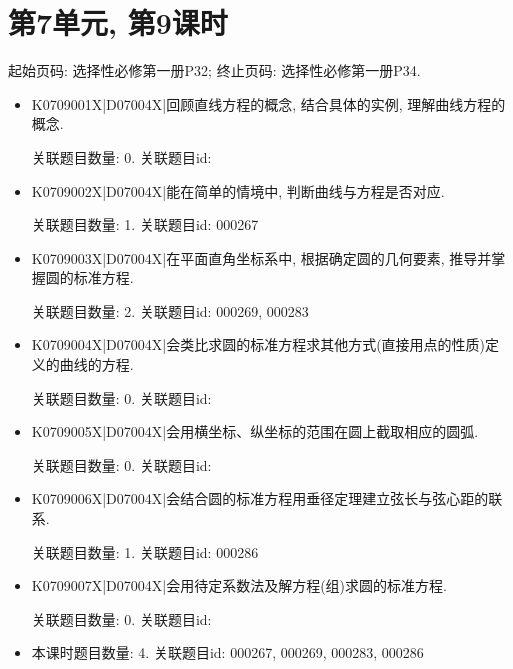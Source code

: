 \section*{第7单元, 第9课时}
起始页码: 选择性必修第一册P32; 终止页码: 选择性必修第一册P34.
\begin{itemize}
\item K0709001X|D07004X|回顾直线方程的概念, 结合具体的实例, 理解曲线方程的概念.

关联题目数量: 0. 关联题目id: 

\item K0709002X|D07004X|能在简单的情境中, 判断曲线与方程是否对应.

关联题目数量: 1. 关联题目id: 000267

\item K0709003X|D07004X|在平面直角坐标系中, 根据确定圆的几何要素, 推导并掌握圆的标准方程.

关联题目数量: 2. 关联题目id: 000269, 000283

\item K0709004X|D07004X|会类比求圆的标准方程求其他方式(直接用点的性质)定义的曲线的方程.

关联题目数量: 0. 关联题目id: 

\item K0709005X|D07004X|会用横坐标、纵坐标的范围在圆上截取相应的圆弧.

关联题目数量: 0. 关联题目id: 

\item K0709006X|D07004X|会结合圆的标准方程用垂径定理建立弦长与弦心距的联系.

关联题目数量: 1. 关联题目id: 000286

\item K0709007X|D07004X|会用待定系数法及解方程(组)求圆的标准方程.

关联题目数量: 0. 关联题目id: 

\item 本课时题目数量: 4. 关联题目id: 000267, 000269, 000283, 000286

\end{itemize}

